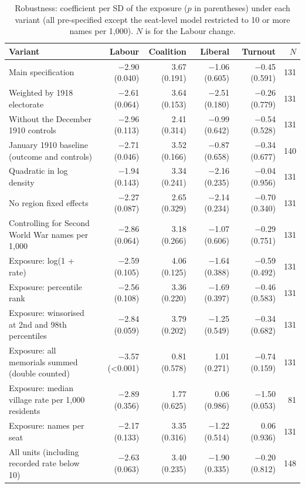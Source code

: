 \documentclass[11pt,a4paper]{article}
\begin{document}
\begin{table}[tbp]\centering\scriptsize\caption{Robustness: coefficient per SD of the exposure ($p$ in parentheses) under each variant (all pre-specified except the seat-level model restricted to 10 or more names per 1,000). $N$ is for the Labour change.}\label{tab:robust}\begin{tabular}{p{6.2cm}rrrrr}\toprule Variant & Labour & Coalition & Liberal & Turnout & $N$\\\midrule
Main specification & $-$2.90 (0.040) & 3.67 (0.191) & $-$1.06 (0.605) & $-$0.45 (0.591) & 131\\
Weighted by 1918 electorate & $-$2.61 (0.064) & 3.64 (0.153) & $-$2.51 (0.180) & $-$0.26 (0.779) & 131\\
Without the December 1910 controls & $-$2.96 (0.113) & 2.41 (0.314) & $-$0.99 (0.642) & $-$0.54 (0.528) & 131\\
January 1910 baseline (outcome and controls) & $-$2.71 (0.046) & 3.52 (0.166) & $-$0.87 (0.658) & $-$0.34 (0.677) & 140\\
Quadratic in log density & $-$1.94 (0.143) & 3.34 (0.241) & $-$2.16 (0.235) & $-$0.04 (0.956) & 131\\
No region fixed effects & $-$2.27 (0.087) & 2.65 (0.329) & $-$2.14 (0.234) & $-$0.70 (0.340) & 131\\
Controlling for Second World War names per 1,000 & $-$2.86 (0.064) & 3.18 (0.266) & $-$1.07 (0.606) & $-$0.29 (0.751) & 131\\
Exposure: log(1 + rate) & $-$2.59 (0.105) & 4.06 (0.125) & $-$1.64 (0.388) & $-$0.59 (0.492) & 131\\
Exposure: percentile rank & $-$2.56 (0.108) & 3.36 (0.220) & $-$1.69 (0.397) & $-$0.46 (0.583) & 131\\
Exposure: winsorised at 2nd and 98th percentiles & $-$2.84 (0.059) & 3.79 (0.202) & $-$1.25 (0.549) & $-$0.34 (0.682) & 131\\
Exposure: all memorials summed (double counted) & $-$3.57 (<0.001) & 0.81 (0.578) & 1.01 (0.271) & $-$0.74 (0.159) & 131\\
Exposure: median village rate per 1,000 residents & $-$2.89 (0.356) & 1.77 (0.625) & 0.06 (0.986) & $-$1.50 (0.053) & 81\\
Exposure: names per seat & $-$2.17 (0.133) & 3.35 (0.316) & $-$1.22 (0.514) & 0.06 (0.936) & 131\\
All units (including recorded rate below 10) & $-$2.63 (0.063) & 3.40 (0.235) & $-$1.90 (0.335) & $-$0.20 (0.812) & 148\\

\end{tabular}
\end{table}
\end{document}
